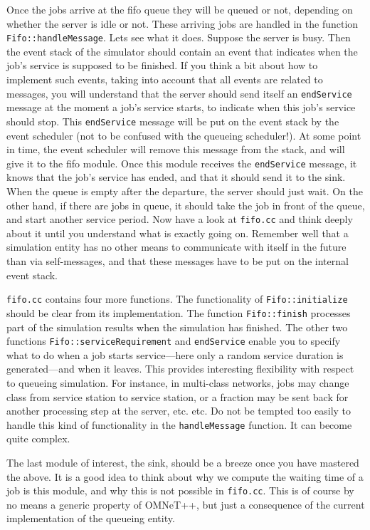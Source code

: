 \documentclass[a4paper]{article}
\begin{document}
Once the jobs arrive at the fifo queue they will be queued or not,
depending on whether the server is idle or not.  These arriving jobs
are handled in the function \texttt{Fifo::handleMessage}. Lets see
what it does.  Suppose the server is busy. Then the event stack of the
simulator should contain an event that indicates when the job's
service is supposed to be finished.  If you think a bit about how to
implement such events, taking into account that all events are related
to messages, you will understand that the server should send itself an
\texttt{endService} message at the moment a job's service starts, to
indicate when this job's service should stop.  This
\texttt{endService} message will be put on the event stack by the
event scheduler (not to be confused with the queueing scheduler!). At
some point in time, the event scheduler will remove this message from
the stack, and will give it to the fifo module.  Once this module
receives the \texttt{endService} message, it knows that the job's
service has ended, and that it should send it to the sink. When the
queue is empty after the departure, the server should just wait. On
the other hand, if there are jobs in queue, it should take the job in
front of the queue, and start another service period. Now have a look
at \texttt{fifo.cc} and think deeply about it until you understand
what is exactly going on. Remember well that a simulation entity has
no other means to communicate with itself in the future than via
self-messages, and that these messages have to be put on the internal
event stack.

\texttt{fifo.cc} contains four more functions. The functionality of
\texttt{Fifo::initialize} should be clear from its implementation. The
function \texttt{Fifo::finish} processes part of the simulation
results when the simulation has finished.  The other two functions
\texttt{Fifo::serviceRequirement} and \texttt{endService} enable you
to specify what to do when a job starts service---here only a random
service duration is generated---and when it leaves. This provides
interesting flexibility with respect to queueing simulation. For
instance, in multi-class networks, jobs may change class from service
station to service station, or a fraction may be sent back for another
processing step at the server, etc. etc. Do not be tempted too easily
to handle this kind of functionality in the \texttt{handleMessage}
function. It can become quite complex.

The last module  of interest, the sink, should be a breeze once
you have mastered the above. It is a good idea to think about why we
compute the waiting time of a job is this module, and why this is not
possible in \texttt{fifo.cc}. This is of course by no means a generic
property of OMNeT++, but just a consequence of the current
implementation of the queueing entity.
\end{document}

